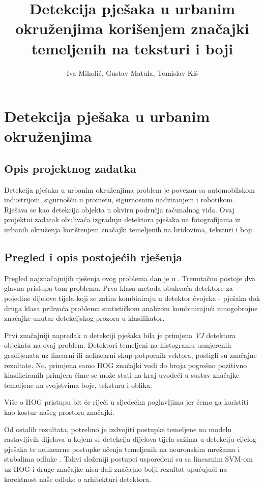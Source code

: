 \documentclass[seminar]{fer}
\title{Detekcija pješaka u urbanim okruženjima korišenjem značajki temeljenih na teksturi i boji}
\author{Iva Miholić, Gustav Matula, Tomislav Kiš}
\begin{document}
\maketitle
\tableofcontents

\chapter{Detekcija pješaka u urbanim okruženjima}
\section{Opis projektnog zadatka}
Detekcija pješaka u urbanim okruženjima problem je povezan sa automobilskom industrijom, sigurnošću u prometu, sigurnosnim nadziranjem i robotikom. Rješava se kao detekcija objekta u okviru područja računalnog vida. Ovaj projektni zadatak obuhvaća izgradnju detektora pješaka na fotografijama iz urbanih okruženja korištenjem značajki temeljenih na bridovima,  teksturi i boji.

\section{Pregled i opis postojećih rješenja}

Pregled najznačajnijih rješenja ovog problema dan je u \cite{BenensonOHS14}. Trenutačno postoje dva glavna pristupa tom problemu. Prva klasa metoda obuhvaća detektore za pojedine dijelove tijela koji se zatim kombiniraju u detektor čvojeka - pješaka dok druga klasa prihvaća problemu statističkom analizom kombinirajući mnogobrojne značajke unutar detekcijskog prozora u klasifikator. 


Prvi značajniji napredak u detekciji pješaka bila je primjena \emph{VJ} detektora objekata \cite{VJ} na ovaj problem. Detektori temeljeni na histogramu usmjerenih gradijenata  \cite{HOG}  uz linearni ili nelinearni skup potpornih vektora, postigli su značajne rezultate. No, primjena samo HOG značajki vodi do broja pogrešno pozitivno klasificiranih primjera čime se može stati na kraj uvodeći u sustav značajke temeljene na svojstvima boje, tekstura i oblika. 

Više o HOG pristupu bit će riječi u sljedećim poglavljima jer ćemo ga koristiti kao kostur našeg prostora značajki.

Od ostalih rezultata, potrebno je izdvojiti postupke temeljene na modelu rastavljivih dijelova   u kojem se detekcija dijelova tijela sažima u detekciju cijelog pješaka te nelinearne postupke učenja temeljenih na neuronskim mrežama i stabalima odluke \cite{BenensonOHS14}. Takvi složeniji postupci uspoređeni su sa linearnim SVM-om uz HOG i druge značajke nisu dali značajno bolji rezultat upućujući na korektnost naše odluke o arhitekturi detektora.
\end{document}
